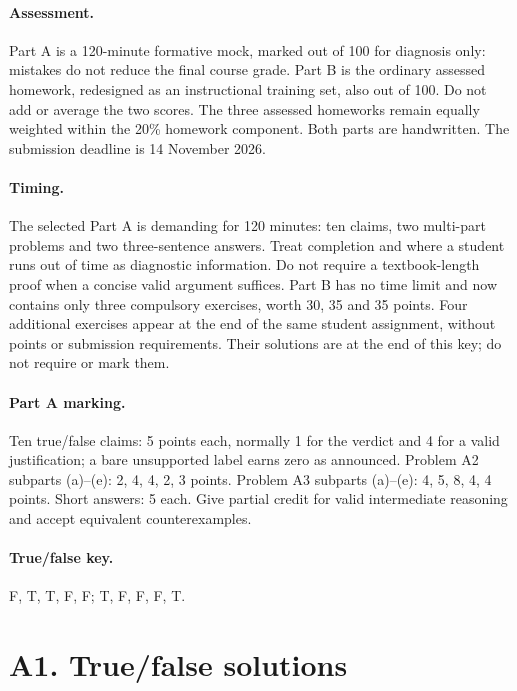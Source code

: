 \documentclass[11pt,a4paper]{article}
\begin{document}
\paragraph{Assessment.} Part A is a 120-minute formative mock, marked out of 100 for diagnosis only: mistakes do not reduce the final course grade. Part B is the ordinary assessed homework, redesigned as an instructional training set, also out of 100. Do not add or average the two scores. The three assessed homeworks remain equally weighted within the 20\% homework component. Both parts are handwritten. The submission deadline is 14 November 2026.
\paragraph{Timing.} The selected Part A is demanding for 120 minutes: ten claims, two multi-part problems and two three-sentence answers. Treat completion and where a student runs out of time as diagnostic information. Do not require a textbook-length proof when a concise valid argument suffices. Part B has no time limit and now contains only three compulsory exercises, worth 30, 35 and 35 points. Four additional exercises appear at the end of the same student assignment, without points or submission requirements. Their solutions are at the end of this key; do not require or mark them.
\paragraph{Part A marking.} Ten true/false claims: 5 points each, normally 1 for the verdict and 4 for a valid justification; a bare unsupported label earns zero as announced. Problem A2 subparts (a)--(e): 2, 4, 4, 2, 3 points. Problem A3 subparts (a)--(e): 4, 5, 8, 4, 4 points. Short answers: 5 each. Give partial credit for valid intermediate reasoning and accept equivalent counterexamples.
\paragraph{True/false key.} F, T, T, F, F; T, F, F, F, T.
\section*{A1. True/false solutions}
\clearpage\clearpage\clearpage\clearpage\clearpage
\end{document}
